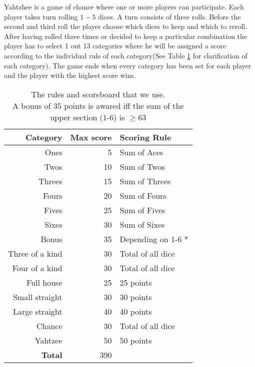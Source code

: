 Yahtzhee is a game of chance where one or more players can participate. Each player takes turn rolling $1-5$ dices. A turn consists of three rolls. Before the second and third roll the player choose which dices to keep and which to reroll. After having rolled three times or decided to keep a particular combination the player has to select 1 out 13 categories where he will be assigned a score according to the individual rule of each category(See Table \ref{tab:rollout_cap_results} for clarification of each category). The game ends when every category has been set for each player and the player with the highest score wins.

\begin{table}
\centering
\begin{tabular}{|r|r|l|}
\hline
\textbf{Category} & \textbf{Max score} & \textbf{Scoring Rule} \\ \hline
Ones				&  5 & Sum of Aces 			\\ \hline
Twos				& 10 & Sum of Twos 			\\ \hline
Threes				& 15 & Sum of Threes 		\\ \hline
Fours				& 20 & Sum of Fours 		\\ \hline
Fives				& 25 & Sum of Fives 		\\ \hline
Sixes				& 30 & Sum of Sixes 		\\ \Xhline{3\arrayrulewidth}
Bonus				& 35 & Depending on 1-6 *	\\ \Xhline{3\arrayrulewidth}
Three of a kind		& 30 & Total of all dice 	\\ \hline
Four of a kind		& 30 & Total of all dice 	\\ \hline
Full house			& 25 & 25 points 			\\ \hline
Small straight		& 30 & 30 points 			\\ \hline
Large straight		& 40 & 40 points 			\\ \hline	
Chance				& 30 & Total of all dice 	\\ \hline	
Yahtzee				& 50 & 50 points 			\\ \Xhline{5\arrayrulewidth}
\textbf{Total}		& 390 &						\\ \hline
\end{tabular}
\caption{The rules and scoreboard that we use. \\
\textasteriskcentered A bonus of 35 points is awared iff the sum of the upper section (1-6) is $\ge 63$}
	\label{tab:rollout_cap_results}
\end{table}